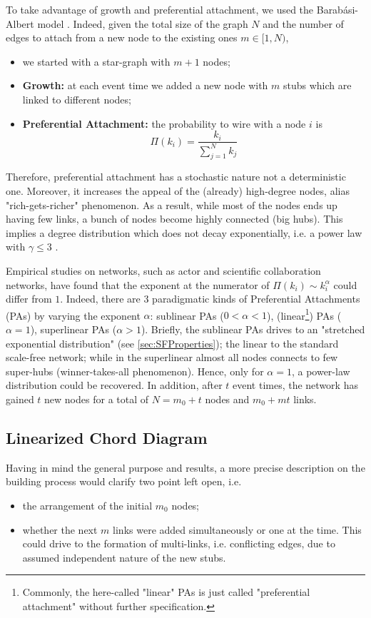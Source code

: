 \documentclass[a4paper,10pt, oneside]{book} %
\theoremstyle{definition}
\begin{document}
\label{sec:BA_model}
To take advantage of growth and preferential attachment, we used the Barabási-Albert model \cite{barabasi::2016networkbook}. Indeed, given the total size of the graph $ N$ and the number of edges to attach from a new node to the existing ones $ m \in [1,N)$, 
\begin{itemize}
	\item we started with a star-graph with $m+1$ nodes;
	\item \textbf{Growth:} at each event time we added a new node with $m$ stubs which are linked to different nodes;
	\item \textbf{Preferential Attachment:} the probability to wire with a node $i$ is
	\begin{equation}
		\Pi(k_i) = \frac{k_i}{\sum_{j = 1}^N k_j}
	\end{equation}
\end{itemize}

Therefore, preferential attachment has a stochastic nature not a deterministic one. Moreover, it increases the appeal of the (already) high-degree nodes, alias \label{cit:SaraSagone1} "rich-gets-richer" phenomenon. As a result, while most of the nodes ends up having few links, a bunch of nodes become highly connected (big hubs). This implies a degree distribution which does not decay exponentially, i.e. a power law with $\gamma \leq 3$ \cite{barabasi::2016networkbook}. 

Empirical studies on networks, such as actor and scientific collaboration networks, have found that the exponent at the numerator of $\Pi(k_i) \sim k_i^\alpha$ could differ from $1$.
Indeed, there are $3$ paradigmatic kinds of Preferential Attachments (PAs) by varying the exponent $\alpha$: sublinear PAs ($0<\alpha<1$), (linear\footnote{Commonly, the here-called "linear" PAs is just called "preferential attachment" without further specification.}) PAs ($\alpha = 1$), superlinear PAs ($\alpha>1$). Briefly, the sublinear PAs drives to an "stretched exponential distribution" (see \autoref{sec:SFProperties}); the linear to the standard scale-free network; while in the superlinear almost all nodes connects to few super-hubs (winner-takes-all phenomenon).
Hence, only for $\alpha = 1$, a power-law distribution could be recovered. In addition, after $t$ event times, the network has gained $t$ new nodes for a total of $N = m_0 + t$ nodes and $m_0 + mt$ links.

\newpage
\subsection{Linearized Chord Diagram}
Having in mind the general purpose and results, a more precise description on the building process would clarify two point left open, i.e. 
\begin{itemize}
	\item the arrangement of the initial $m_0$ nodes;
	\item whether the next $m$ links were added simultaneously or one at the time. This could drive to the formation of multi-links, i.e. conflicting edges, due to assumed independent nature of the new stubs. 
\end{itemize}
\end{document}
